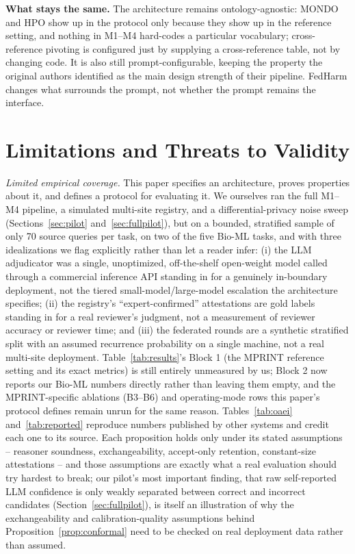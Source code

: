 \documentclass[conference]{IEEEtran}
\begin{document}
\textbf{What stays the same.} The architecture remains ontology-agnostic: MONDO and HPO show up in the protocol only because they show up in the reference setting, and nothing in M1--M4 hard-codes a particular vocabulary; cross-reference pivoting is configured just by supplying a cross-reference table, not by changing code. It is also still prompt-configurable, keeping the property the original authors identified as the main design strength of their pipeline. FedHarm changes what surrounds the prompt, not whether the prompt remains the interface.

\section{Limitations and Threats to Validity}
\label{sec:limitations}

\textit{Limited empirical coverage.} This paper specifies an architecture, proves properties about it, and defines a protocol for evaluating it. We ourselves ran the full M1--M4 pipeline, a simulated multi-site registry, and a differential-privacy noise sweep (Sections~\ref{sec:pilot} and~\ref{sec:fullpilot}), but on a bounded, stratified sample of only 70 source queries per task, on two of the five Bio-ML tasks, and with three idealizations we flag explicitly rather than let a reader infer: (i) the LLM adjudicator was a single, unoptimized, off-the-shelf open-weight model called through a commercial inference API standing in for a genuinely in-boundary deployment, not the tiered small-model/large-model escalation the architecture specifies; (ii) the registry's ``expert-confirmed'' attestations are gold labels standing in for a real reviewer's judgment, not a measurement of reviewer accuracy or reviewer time; and (iii) the federated rounds are a synthetic stratified split with an assumed recurrence probability on a single machine, not a real multi-site deployment. Table~\ref{tab:results}'s Block 1 (the MPRINT reference setting and its exact metrics) is still entirely unmeasured by us; Block 2 now reports our Bio-ML numbers directly rather than leaving them empty, and the MPRINT-specific ablations (B3--B6) and operating-mode rows this paper's protocol defines remain unrun for the same reason. Tables~\ref{tab:oaei} and~\ref{tab:reported} reproduce numbers published by other systems and credit each one to its source. Each proposition holds only under its stated assumptions -- reasoner soundness, exchangeability, accept-only retention, constant-size attestations -- and those assumptions are exactly what a real evaluation should try hardest to break; our pilot's most important finding, that raw self-reported LLM confidence is only weakly separated between correct and incorrect candidates (Section~\ref{sec:fullpilot}), is itself an illustration of why the exchangeability and calibration-quality assumptions behind Proposition~\ref{prop:conformal} need to be checked on real deployment data rather than assumed.
\end{document}
